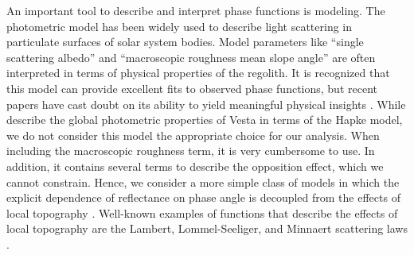 \documentclass[3p,authoryear]{elsarticle}
\begin{document}
An important tool to describe and interpret phase functions is modeling. The \citet{H81,H02} photometric model has been widely used to describe light scattering in particulate surfaces of solar system bodies. Model parameters like ``single scattering albedo'' and ``macroscopic roughness mean slope angle'' are often interpreted in terms of physical properties of the regolith. It is recognized that this model can provide excellent fits to observed phase functions, but recent papers have cast doubt on its ability to yield meaningful physical insights \citep{SH07,TM10}. While \citet{L13} describe the global photometric properties of Vesta in terms of the Hapke model, we do not consider this model the appropriate choice for our analysis. When including the macroscopic roughness term, it is very cumbersome to use. In addition, it contains several terms to describe the opposition effect, which we cannot constrain. Hence, we consider a more simple class of models in which the explicit dependence of reflectance on phase angle is decoupled from the effects of local topography \citep{K01,S11}. Well-known examples of functions that describe the effects of local topography are the Lambert, Lommel-Seeliger, and Minnaert scattering laws \citep{M41}.
\end{document}
